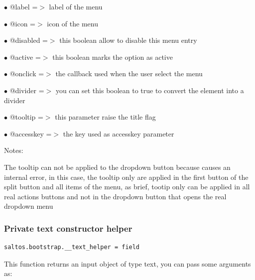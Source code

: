 \documentclass[a4paper]{article}
\begin{document}
\begin{compactitem}
\item[\color{myblue}$\bullet$] @label     =$>$ label of the menu
\item[\color{myblue}$\bullet$] @icon      =$>$ icon of the menu
\item[\color{myblue}$\bullet$] @disabled  =$>$ this boolean allow to disable this menu entry
\item[\color{myblue}$\bullet$] @active    =$>$ this boolean marks the option as active
\item[\color{myblue}$\bullet$] @onclick   =$>$ the callback used when the user select the menu
\item[\color{myblue}$\bullet$] @divider   =$>$ you can set this boolean to true to convert the element into a divider
\item[\color{myblue}$\bullet$] @tooltip   =$>$ this parameter raise the title flag
\item[\color{myblue}$\bullet$] @accesskey =$>$ the key used as accesskey parameter
\end{compactitem}

Notes:

The tooltip can not be applied to the dropdown button because causes an internal error,
in this case, the tooltip only are applied in the first button of the split button and
all items of the menu, as brief, tootip only can be applied in all real actions buttons
and not in the dropdown button that opens the real dropdown menu

\hypertarget{toc93}{}
\subsubsection{Private text constructor helper}

\begin{lstlisting}
saltos.bootstrap.__text_helper = field
\end{lstlisting}

This function returns an input object of type text, you can pass some arguments as:
\end{document}
